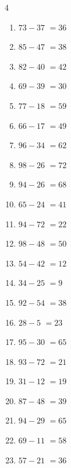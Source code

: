 \begin{multicols}{4}
\begin{enumerate}
  \item $73-37$
        $=36$

  \item $85-47$
        $=38$

  \item $82-40$
        $=42$

  \item $69-39$
        $=30$

  \item $77-18$
        $=59$

  \item $66-17$
        $=49$

  \item $96-34$
        $=62$

  \item $98-26$
        $=72$

  \item $94-26$
        $=68$

  \item $65-24$
        $=41$

  \item $94-72$
        $=22$

  \item $98-48$
        $=50$

  \item $54-42$
        $=12$

  \item $34-25$
        $=9$

  \item $92-54$
        $=38$

\columnbreak %

\resetques

  \item $28-5$
        $=23$

  \item $95-30$
        $=65$

  \item $93-72$
        $=21$

  \item $31-12$
        $=19$

  \item $87-48$
        $=39$

  \item $94-29$
        $=65$

  \item $69-11$
        $=58$

  \item $57-21$
        $=36$


\end{enumerate}
\end{multicols}
